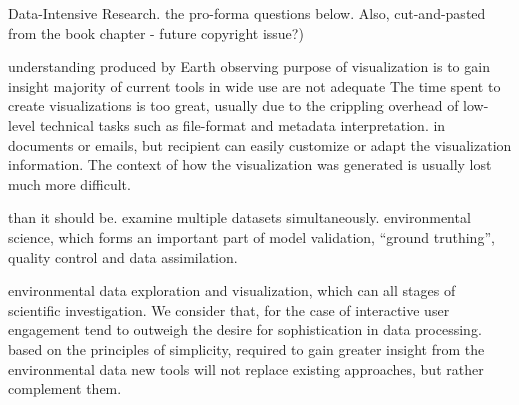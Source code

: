 \documentclass[times]{cpeauth}
\begin{document}

Data-Intensive Research.  %
the pro-forma questions below.  Also, %
cut-and-pasted from the book chapter - future copyright issue?)

understanding %
produced by Earth observing %
purpose of visualization is to gain insight %
majority of current tools in wide use are not adequate %
The time spent to create visualizations is too great, usually due to the %
crippling overhead of low-level technical tasks such as file-format and metadata
interpretation.  %
in documents or emails, but %
recipient can easily customize or adapt the visualization %
information.  The context of how the visualization was generated is usually lost
much more difficult.

than it should be.  %
examine multiple datasets simultaneously.  %
environmental science, which forms an important part of model validation, %
``ground truthing'', quality control and data assimilation.

environmental data exploration and visualization, which can %
all stages of scientific investigation.  We consider that, for the case of
interactive %
user engagement tend to outweigh the desire for sophistication in data
processing.  %
based on the principles of simplicity, %
required to gain greater insight from the environmental data %
new tools will not replace existing approaches, but rather complement them.
\end{document}
